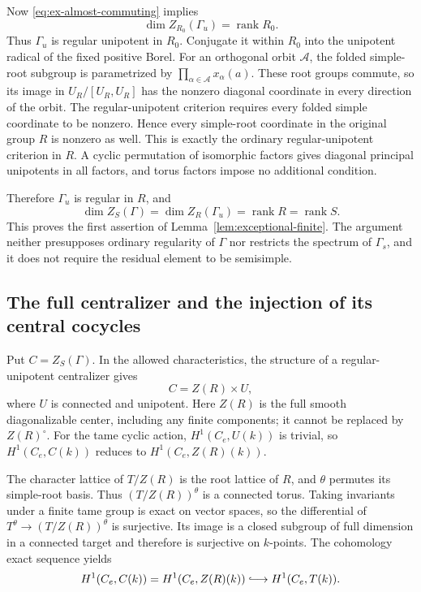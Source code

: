 \documentclass[11pt,a4paper]{article}
\theoremstyle{definition}
\theoremstyle{remark}
\begin{document}
Now \eqref{eq:ex-almost-commuting} implies
\begin{equation}\label{eq:ex-folded-regularity}
\dim Z_{R_0}(\Gamma_u)=\operatorname{rank}R_0.
\end{equation}
Thus \(\Gamma_u\) is regular unipotent in \(R_0\).
Conjugate it within \(R_0\) into the unipotent radical of the fixed
positive Borel.
For an orthogonal orbit \(\mathcal A\), the folded simple-root subgroup is
parametrized by
\(\prod_{\alpha\in\mathcal A}x_\alpha(a)\).
These root groups commute, so its image in \(U_R/[U_R,U_R]\) has the
nonzero diagonal coordinate in every direction of the orbit.
The regular-unipotent criterion requires every folded simple coordinate
to be nonzero. Hence every simple-root coordinate in the original
group \(R\) is nonzero as well.
This is exactly the ordinary regular-unipotent criterion in \(R\).
A cyclic permutation of isomorphic factors gives diagonal principal
unipotents in all factors, and torus factors impose no additional condition.

Therefore \(\Gamma_u\) is regular in \(R\), and
\begin{equation}\label{eq:ex-ordinary-regularity}
\dim Z_S(\Gamma)
=\dim Z_R(\Gamma_u)=\operatorname{rank}R
=\operatorname{rank}S.
\end{equation}
This proves the first assertion of Lemma~\ref{lem:exceptional-finite}.
The argument neither presupposes ordinary regularity of \(\Gamma\) nor
restricts the spectrum of \(\Gamma_s\), and it does not require the
residual element to be semisimple.

\subsection{The full centralizer and the injection of its central cocycles}
\label{subsec:ex-full-centralizer}

Put \(C=Z_S(\Gamma)\).
In the allowed characteristics, the structure of a regular-unipotent
centralizer gives
\begin{equation}\label{eq:ex-centralizer-structure}
C=Z(R)\times U,
\end{equation}
where \(U\) is connected and unipotent.
Here \(Z(R)\) is the full smooth diagonalizable center, including any
finite components; it cannot be replaced by \(Z(R)^\circ\).
For the tame cyclic action, \(H^1(C_e,U(k))\) is trivial, so
\(H^1(C_e,C(k))\) reduces to \(H^1(C_e,Z(R)(k))\).

The character lattice of \(T/Z(R)\) is the root lattice of \(R\), and
\(\theta\) permutes its simple-root basis.
Thus \((T/Z(R))^\theta\) is a connected torus.
Taking invariants under a finite tame group is exact on vector spaces,
so the differential of
\(T^\theta\longrightarrow(T/Z(R))^\theta\)
is surjective.
Its image is a closed subgroup of full dimension in a connected target
and therefore is surjective on \(k\)-points.
The cohomology exact sequence yields
\begin{equation}\label{eq:ex-central-cohomology-injection}
H^1(C_e,C(k))=H^1(C_e,Z(R)(k))
\lhook\joinrel\longrightarrow H^1(C_e,T(k)).
\end{equation}
\end{document}
